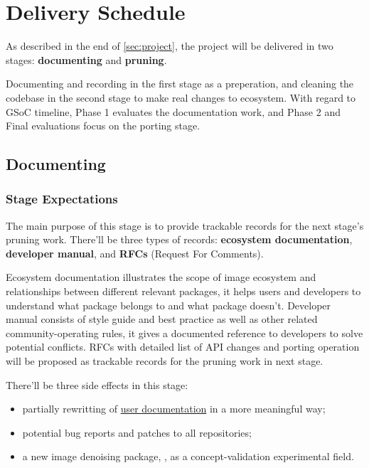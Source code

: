 
\section{Delivery Schedule}\label{sec:delivery}

As described in the end of \cref{sec:project}, the project will be delivered in two stages: \textbf{documenting} and \textbf{pruning}.

Documenting and recording in the first stage as a preperation, and cleaning the codebase in the second stage to make real changes to \images{} ecosystem. With regard to GSoC timeline, \textsf{Phase 1} evaluates the documentation work, and \textsf{Phase 2} and \textsf{Final} evaluations focus on the porting stage.

\subsection{Documenting}\label{subsec:documentation}

\subsubsection*{Stage Expectations}

The main purpose of this stage is to provide trackable records for the next stage's pruning work. There'll be three types of records: \textbf{ecosystem documentation}, \textbf{developer manual}, and \textbf{RFCs} (Request For Comments). \par

Ecosystem documentation illustrates the scope of image ecosystem and relationships between different relevant packages, it helps users and developers to understand what package belongs to \images{} and what package doesn't. Developer manual consists of style guide and best practice as well as other related community-operating rules, it gives a documented reference to developers to solve potential conflicts. RFCs with detailed list of API changes and porting operation will be proposed as trackable records for the pruning work in next stage. \par

There'll be three side effects in this stage:

\begin{itemize}
    \item partially rewritting of \href{https://juliaimages.org}{user documentation} in a more meaningful way;
    \item potential bug reports and patches to all \langjulia repositories;
    \item a new image denoising package, \repoimagenoise, as a concept-validation experimental field.
\end{itemize}

